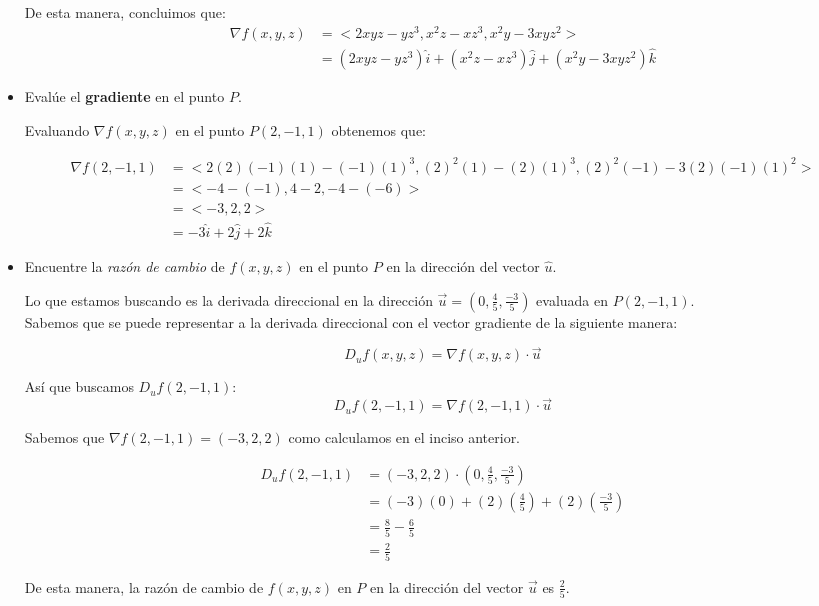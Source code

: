 \documentclass[12pt]{article}
\begin{document}
\begin{itemize}[format=\textbf]
\begin{itemize}
  \end{itemize}
  
  De esta manera, concluimos que:
  \begin{align*}
    \nabla f(x,y,z) &= <2xyz - yz^3, x^2z - xz^3, x^2y - 3xyz^2> \\
    &= (2xyz - yz^3)\hat{i} + (x^2z - xz^3)\hat{j} + (x^2y - 3xyz^2)\hat{k}
  \end{align*}

\item Evalúe el \textbf{gradiente} en el punto $P$.

  Evaluando $\nabla f(x,y,z)$ en el punto $P(2, -1, 1)$ obtenemos que:
  
  \begin{align*}
    \nabla f(2,-1,1) 
    &= <2(2)(-1)(1) - (-1)(1)^3, (2)^2(1) - (2)(1)^3, (2)^2(-1) - 3(2)(-1)(1)^2> \\
    &= <-4-(-1), 4-2, -4-(-6)> \\
    &= <-3, 2, 2> \\
    &= -3\hat{i} + 2\hat{j} + 2\hat{k}
  \end{align*}

\item Encuentre la \textit{razón de cambio} de $f(x, y, z)$ en el punto $P$ en la dirección del vector $\hat{u}$.

  Lo que estamos buscando es la derivada direccional en la dirección $\vec{u}=\left(0,\frac{4}{5},\frac{-3}{5} \right)$ evaluada en $P(2, -1, 1)$.\\
  
  Sabemos que se puede representar a la derivada direccional con el vector gradiente de la siguiente manera:
  
  \[
  D_uf(x,y,z) = \nabla f(x,y,z) \cdot \vec{u}
  \]

  Así que buscamos $ D_uf(2,-1,1)$:
  \[
  D_uf(2,-1,1) = \nabla f(2,-1,1) \cdot \vec{u}
  \]

  Sabemos que $\nabla f(2,-1,1) = (-3,2,2)$ como calculamos en el inciso anterior.

  \begin{align*}
    D_uf(2,-1,1)
    &= (-3,2,2) \cdot \left(
    0,\frac{4}{5},\frac{-3}{5}
    \right) \\
    &= (-3)(0) + (2)\left(\frac{4}{5}\right) + (2)\left(\frac{-3}{5}\right) \\
    &= \frac{8}{5} - \frac{6}{5} \\
    &= \frac{2}{5}
  \end{align*}

  De esta manera, la razón de cambio de $f(x, y, z)$ en $P$ en la dirección del vector $\vec{u}$ es $\frac{2}{5}$.
  
\end{itemize}
\end{document}
